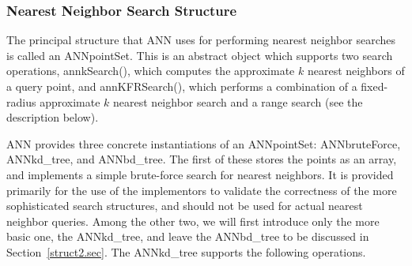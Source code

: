 \documentclass[11pt]{article}		%
\newcommand{\ANN}[0]{\textsf{ANN}}
\begin{document}
\subsubsection{Nearest Neighbor Search Structure}\label{struct.sec}

The principal structure that {\ANN} uses for performing nearest neighbor
searches is called an \textsf{ANNpointSet}.  This is an abstract object
which supports two search operations, \textsf{annkSearch()}, which
computes the approximate $k$ nearest neighbors of a query point, and
\textsf{annKFRSearch()}, which performs a combination of a fixed-radius
approximate $k$ nearest neighbor search and a range search (see the
description below).

{\ANN} provides three concrete instantiations of an
\textsf{ANNpointSet}: \textsf{ANNbruteForce}, \textsf{ANNkd\_tree}, and
\textsf{ANNbd\_tree}.  The first of these stores the points as an array,
and implements a simple brute-force search for nearest neighbors.  It is
provided primarily for the use of the implementors to validate the
correctness of the more sophisticated search structures, and should not
be used for actual nearest neighbor queries.  Among the other two, we
will first introduce only the more basic one, the \textsf{ANNkd\_tree},
and leave the \textsf{ANNbd\_tree} to be discussed in
Section~\ref{struct2.sec}.  The \textsf{ANNkd\_tree} supports the
following operations.
\end{document}
